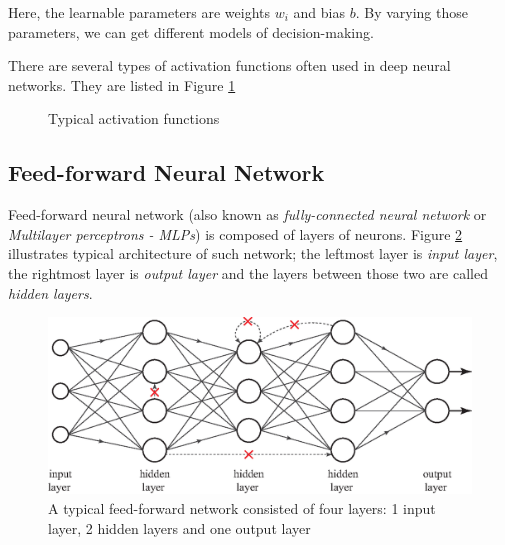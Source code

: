 Here, the learnable parameters are weights $w_i$ and bias $b$. By varying those parameters, we can get different models of decision-making.

There are several types of activation functions often used in deep neural networks. They are listed in Figure \ref{fig:activation-function}
\begin{figure}[h]
	\centering
	\qquad
	\qquad
	\caption{Typical activation functions}
	\label{fig:activation-function}
\end{figure}


\subsection{Feed-forward Neural Network}
Feed-forward neural network (also known as \textit{fully-connected neural network} or \textit{Multilayer perceptrons - MLPs}) is composed of layers of neurons. Figure \ref{fig:ff-net} illustrates typical architecture of such network; the leftmost layer is \textit{input layer}, the rightmost layer is \textit{output layer} and the layers between those two are called \textit{hidden layers}.

\begin{figure}
	\centering
	\includegraphics[width=0.85\linewidth]{Chapters/Fig/FFNN.eps}
	\caption[A typical feed-forward network]{A typical feed-forward network consisted of four layers: 1 input layer, 2 hidden layers and one output layer}
	\label{fig:ff-net}
\end{figure}

